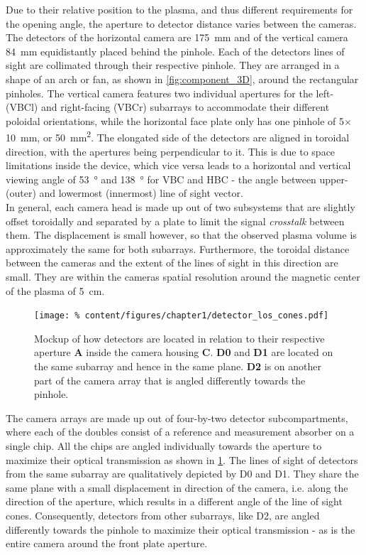             Due to their relative position to the plasma, and thus different requirements for the opening angle, the aperture to detector distance varies between the cameras. The detectors of the horizontal camera are \SI{175}{\milli\meter} and of the vertical camera \SI{84}{\milli\meter} equidistantly placed behind the pinhole. Each of the detectors lines of sight are collimated through their respective pinhole. They are arranged in a shape of an arch or fan, as shown in \cref{fig:component_3D}, around the rectangular pinholes. The vertical camera features two individual apertures for the left- (VBCl) and right-facing (VBCr) subarrays to accommodate their different poloidal orientations, while the horizontal face plate only has one pinhole of 5$\times$\SI{10}{\milli\meter}, or \SI{50}{\milli\meter\squared}. The elongated side of the detectors are aligned in toroidal direction, with the apertures being perpendicular to it. This is due to space limitations inside the device, which vice versa leads to a horizontal and vertical viewing angle of \SI{53}{\degree} and \SI{138}{\degree} for VBC and HBC - the angle between upper- (outer) and lowermost (innermost) line of sight vector.\\%
            In general, each camera head is made up out of two subsystems that are slightly offset toroidally and separated by a plate to limit the signal \textit{crosstalk} between them. The displacement is small however, so that the observed plasma volume is approximately the same for both subarrays. Furthermore, the toroidal distance between the cameras and the extent of the lines of sight in this direction are small. They are within the cameras spatial resolution around the magnetic center of the plasma of \SI{5}{\centi\meter}.\\%
%
            \begin{figure}[t]%
                \centering%
                \texttt{[image: \%
                    content/figures/chapter1/detector\_los\_cones.pdf]}%
                \caption{Mockup of how detectors are located in relation to their respective aperture \textbf{A} inside the camera housing \textbf{C}. \textbf{D0} and \textbf{D1} are located on the same subarray and hence in the same plane. \textbf{D2} is on another part of the camera array that is angled differently towards the pinhole.}\label{fig:loscones}%
            \end{figure}%
%
            The camera arrays are made up out of four-by-two detector subcompartments, where each of the doubles consist of a reference and measurement absorber on a single chip. All the chips are angled individually towards the aperture to maximize their optical transmission as shown in \cref{fig:loscones}. The lines of sight of detectors from the same subarray are qualitatively depicted by D0 and D1. They share the same plane with a small displacement in direction of the camera, i.e. along the direction of the aperture, which results in a different angle of the line of sight cones. Consequently, detectors from other subarrays, like D2, are angled differently towards the pinhole to maximize their optical transmission - as is the entire camera around the front plate aperture.\\%
